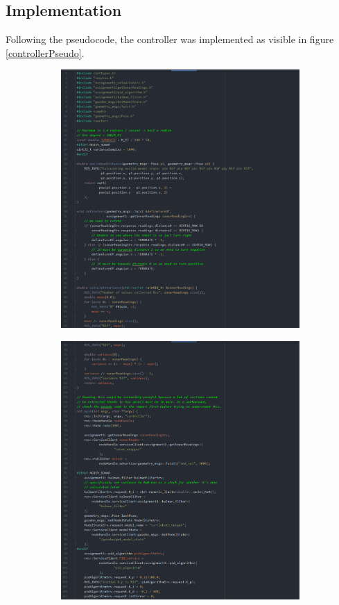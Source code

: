 \documentclass{article}
\begin{document}
\subsection{Implementation}
Following the pseudocode, the controller was implemented as visible in figure
\ref{controllerPseudo}. 
\begin{figure}[ht]
    \begin{subfigure}{.5\textwidth}
        \centering
        \includegraphics[scale=0.24]{img/controller1.png}
    \end{subfigure}
    \begin{subfigure}{.5\textwidth}
        \centering
        \includegraphics[scale=0.24]{img/controller2.png}

\end{subfigure}
\end{figure}
\end{document}
